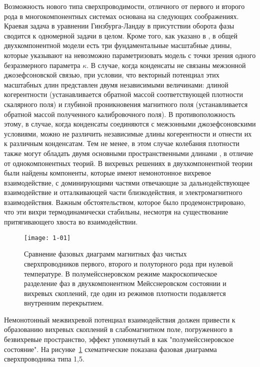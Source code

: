 Возможность нового типа сверхпроводимости, отличного от первого и второго рода 
в многокомпонентных системах \cite{bib:1,bib:2} основана на следующих 
соображениях. Краевая задача в уравнении Гинзбурга-Ландау в присутствии 
оборота фазы сводится к одномерной задачи в целом. Кроме того, как указано в 
\cite{bib:1,bib:2}, в общей двухкомпонентной модели есть три фундаментальные 
масштабные длины, которые указывают на невозможно параметризовать модель с 
точки зрения одного безразмерного параметра \( \kappa \). В случае, когда 
конденсаты не связаны межзонной джозефсоновской связью, при условии, что 
векторный потенциал этих масштабных длин представлен двумя независимыми 
величинами: длиной когерентности (устанавливается обратной массой 
соответствующей плотности скалярного поля) и глубиной проникновения магнитного 
поля (устанавливается обратной массой полученного калибровочного поля). В 
противоположность этому, в случае, когда конденсаты соединяются с межзонными 
джозефсоновскими условиями, можно не различить независимые длины когерентности 
и отнести их к различным конденсатам. Тем не менее, в этом случае колебания 
плотности также могут обладать двумя основными пространственными длинами
\cite{bib:2}, в отличие от однокомпонентных теорий. В \cite{bib:1,bib:2} 
вихревых решениях в двухкомпонентной теории были найдены компоненты, которые 
имеют немонотонное вихревое взаимодействие, с доминирующими частями отвечающие 
за дальнодействующее взаимодействие и отталкивающей части близкодействия, и 
электромагнитного взаимодействия. Важным обстоятельством, которое было 
продемонстрировано, что эти вихри термодинамически стабильны, несмотря на 
существование притягивающего хвоста во взаимодействии.

\begin{figure}[h!]
    \center
    \texttt{[image: 1-01]}
    \caption{Сравнение фазовых диаграмм магнитных фаз чистых сверхпроводников
        первого, второго и полуторного рода при нулевой температуре. В 
        полумейсснеровском режиме макроскопическое разделение фаз в 
        двухкомпонентном Мейсснеровском состоянии и вихревых скоплений, где 
        один из режимов плотности подавляется внутренним перекрытием.}
    \label{fig:1}
\end{figure}

Немонотонный межвихревой потенциал взаимодействия должен привести к 
образованию вихревых скоплений в слабомагнитном поле, погруженного в 
безвихревые пространство, эффект упомянутый в \cite{bib:1} как 
"полумейсснеровское состояние". На рисунке~\ref{fig:1} схематические показана 
фазовая диаграмма сверхпроводника типа 1,5.

